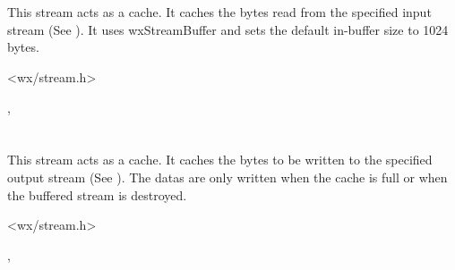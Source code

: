 \section{}\label{wxbufferedinputstream}

This stream acts as a cache. It caches the bytes read from the specified
input stream (See ).
It uses wxStreamBuffer and sets the default in-buffer size to 1024 bytes.




<wx/stream.h>


, 

\section{}\label{wxbufferedoutputstream}

This stream acts as a cache. It caches the bytes to be written to the specified
output stream (See ). The
datas are only written when the cache is full or when the buffered stream is
destroyed.




<wx/stream.h>


, 

